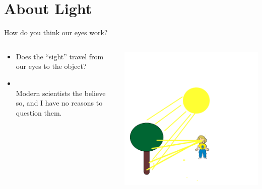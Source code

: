 \section{About Light}
\begin{frame}{How do you think our eyes work?}
  \begin{columns}
    \begin{column}{0.8\textwidth}
      \begin{itemize}
        \item
          Does the ``sight'' travel from our eyes to the object?\\
           {\color{red}{Euclid other Greek believed so around 300 BC}}
        \item
          \color{black}{or the ``light'' travels from the object to our eyes?}\\
           {\color{red}Modern scientists the believe so, and I have no reasons to question them.}
      \end{itemize}
    \end{column}
    \begin{column}{0.2\textwidth}
        \includegraphics[width=\columnwidth]{media/lghtmisc2.png}
    \end{column}
  \end{columns}
\end{frame}

